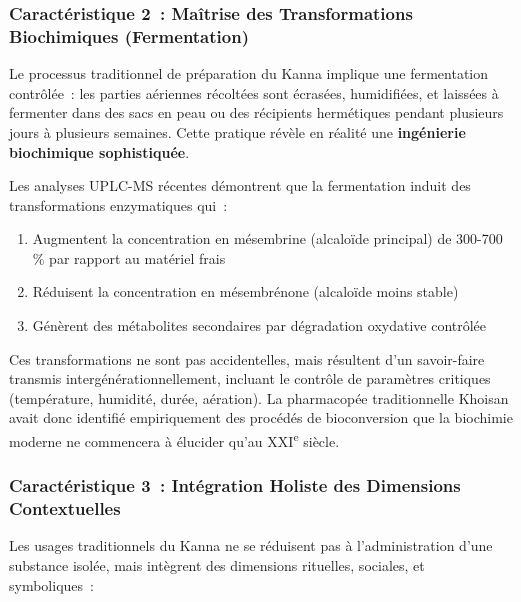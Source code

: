 \documentclass[12pt,a4paper,twoside]{book}
\begin{document}
\subsubsection{Caractéristique 2~: Maîtrise des Transformations Biochimiques (Fermentation)}

Le processus traditionnel de préparation du Kanna implique une fermentation contrôlée~: les parties aériennes récoltées sont écrasées, humidifiées, et laissées à fermenter dans des sacs en peau ou des récipients hermétiques pendant plusieurs jours à plusieurs semaines. Cette pratique révèle en réalité une \textbf{ingénierie biochimique sophistiquée}.

Les analyses UPLC-MS récentes \parencite{chen2019} démontrent que la fermentation induit des transformations enzymatiques qui~:

\begin{enumerate}
\item Augmentent la concentration en mésembrine (alcaloïde principal) de 300-700\,\% par rapport au matériel frais
\item Réduisent la concentration en mésembrénone (alcaloïde moins stable)
\item Génèrent des métabolites secondaires par dégradation oxydative contrôlée
\end{enumerate}

Ces transformations ne sont pas accidentelles, mais résultent d'un savoir-faire transmis intergénérationnellement, incluant le contrôle de paramètres critiques (température, humidité, durée, aération). La pharmacopée traditionnelle Khoisan avait donc identifié empiriquement des procédés de bioconversion que la biochimie moderne ne commencera à élucider qu'au XXI\textsuperscript{e} siècle.

\subsubsection{Caractéristique 3~: Intégration Holiste des Dimensions Contextuelles}

Les usages traditionnels du Kanna ne se réduisent pas à l'administration d'une substance isolée, mais intègrent des dimensions rituelles, sociales, et symboliques~:
\end{document}
